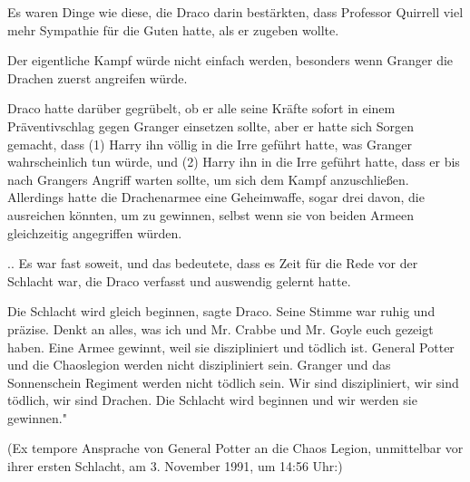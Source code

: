 Es waren Dinge wie diese, die Draco darin bestärkten, dass Professor Quirrell
viel mehr Sympathie für die Guten hatte, als er zugeben wollte.

Der eigentliche Kampf würde nicht einfach werden, besonders wenn Granger die
Drachen zuerst angreifen würde.

Draco hatte darüber gegrübelt, ob er alle seine Kräfte sofort in einem
Präventivschlag gegen Granger einsetzen sollte, aber er hatte sich Sorgen
gemacht, dass (1) Harry ihn völlig in die Irre geführt hatte, was Granger
wahrscheinlich tun würde, und (2) Harry ihn in die Irre geführt hatte, dass er
bis nach Grangers Angriff warten sollte, um sich dem Kampf anzuschließen.
Allerdings hatte die Drachenarmee eine Geheimwaffe, sogar drei davon, die
ausreichen könnten, um zu gewinnen, selbst wenn sie von beiden Armeen
gleichzeitig angegriffen würden.

.. Es war fast soweit, und das bedeutete, dass es Zeit für die Rede vor der
Schlacht war, die Draco verfasst und auswendig gelernt hatte.

\glqq{}Die Schlacht wird gleich beginnen\grqq{}, sagte Draco. Seine Stimme war
ruhig und präzise. \glqq{}Denkt an alles, was ich und Mr. Crabbe und Mr. Goyle
euch gezeigt haben. Eine Armee gewinnt, weil sie diszipliniert und tödlich ist.
General Potter und die Chaoslegion werden nicht diszipliniert sein. Granger und
das Sonnenschein Regiment werden nicht tödlich sein. Wir sind diszipliniert, wir
sind tödlich, wir sind Drachen. Die Schlacht wird beginnen und wir werden sie
gewinnen."

(Ex tempore Ansprache von General Potter an die Chaos Legion, unmittelbar vor
ihrer ersten Schlacht, am 3. November 1991, um 14:56 Uhr:)

